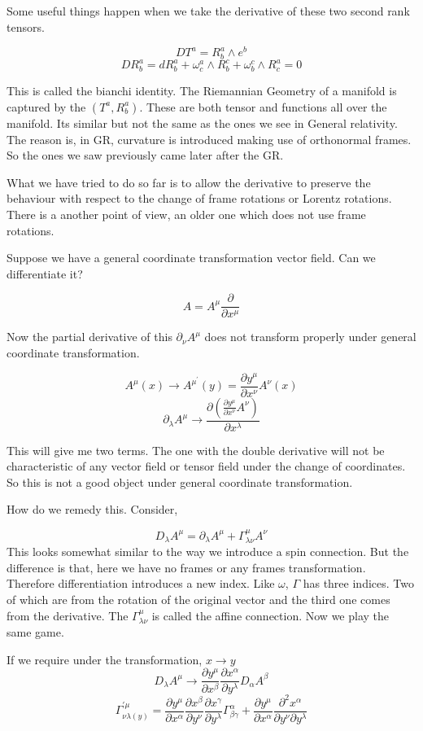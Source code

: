 \documentclass{article}
\begin{document}
Some useful things happen when we take the derivative of these two second rank tensors. 

\[ D T^a = R^a_b \wedge e^b \]
\[ D R^a_b = dR^a_b + \omega^a_c \wedge R^c_b + \omega^c_b \wedge R^a_c  = 0 \] 

This is called the bianchi identity. The Riemannian Geometry of a manifold is captured by the \( ( T^a, R^a_b ) \). These are both tensor and functions all over the manifold. 
Its similar but not the same as the ones we see in General relativity. The reason is, in GR, curvature is introduced making use of orthonormal frames. So the ones we saw previously came later after the GR. 

What we have tried to do so far is to allow the derivative to preserve the behaviour with respect to the change of frame rotations or Lorentz rotations. There is a another point of view, an older one which does not use frame rotations. 

Suppose we have a general coordinate transformation vector field. Can we differentiate it? 

\[ A = A^\mu \frac{\partial }{\partial x^\mu} \] 

Now the partial derivative of this \( \partial_\nu A^\mu \) does not transform properly under general coordinate transformation. 

\[ A^\mu(x) \to A^{\mu^{'}}(y) = \frac{\partial y^\mu}{\partial x^\nu} A^\nu(x) \]
\[ \partial_\lambda A^\mu \to \frac{\partial (\frac{\partial y^\mu}{\partial x^\nu } A^\nu) }{\partial x^\lambda} \]

This will give me two terms. The one with the double derivative will not be characteristic of any vector field or tensor field under the change of coordinates. So this is not a good object under general coordinate transformation. 

How do we remedy this. Consider, 

\[ D_\lambda A^\mu = \partial_\lambda A^\mu + \Gamma ^\mu _{\lambda \nu} A^\nu \]
This looks somewhat similar to the way we introduce a spin connection. But the difference is that, here we have no frames or any frames transformation. Therefore differentiation introduces a new index. Like \( \omega\), \( \Gamma\) has three indices. Two of which are from the rotation of the original vector and the third one comes from the derivative. The \( \Gamma^\mu _{\lambda \nu} \) is called the affine connection. Now we play the same game. 

If we require under the transformation, \( x \to y\)
\[ D_\lambda A^\mu \to \frac{\partial y^\mu}{\partial x^\beta} \frac{\partial x^\alpha}{\partial y^\lambda} D_\alpha A^\beta \]
\[ \Gamma^{' \mu}_{\nu \lambda(y)} = \frac{\partial 
y^\mu}{\partial x^\alpha} \frac{\partial x^\beta}{\partial y^\nu} \frac{\partial x^\gamma}{\partial y^\lambda} \Gamma^\alpha_{\beta \gamma} + \frac{\partial y^\mu}{\partial x^\alpha} \frac{\partial^2 x^\alpha}{\partial y^\nu \partial y^\lambda} \]
\end{document}
